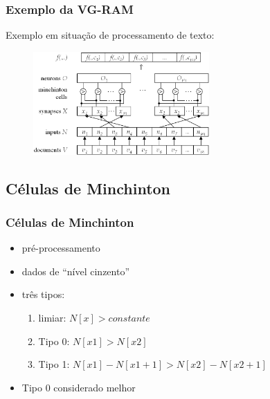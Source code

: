 \documentclass{beamer}
\begin{document}
\begin{frame}
    \frametitle{Exemplo da VG-RAM}
    Exemplo em situação de processamento de texto:
    \begin{figure}[htb]
        \begin{center}
            \includegraphics[width=0.6\textwidth]{imagens/arquitetura}
        \end{center}
    \end{figure}
\end{frame}
\subsection{Células de Minchinton}
\begin{frame}
    \frametitle{Células de Minchinton}
    \begin{itemize}
        \item pré-processamento
        \item dados de ``nível cinzento''
        \item três tipos:
            \begin{enumerate}
                \item limiar: $N[x] > constante$
                \item Tipo 0: $N[x1] > N[x2]$
                \item Tipo 1: $N[x1] - N[x1 + 1] > N[x2] - N[x2+1]$
            \end{enumerate}
        \item Tipo 0 considerado melhor
    \end{itemize}
\end{frame}
\end{document}
